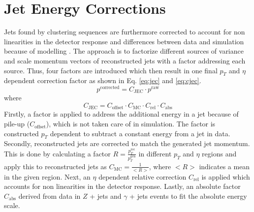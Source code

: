 \section{Jet Energy Corrections}
\label{sec:jec}
	Jets found by clustering sequences are furthermore corrected to account for non linearities in the detector response and differences between data and simulation because of modelling \cite{JEC}. The approach is to factorize different sources of variance and scale momentum vectors of reconstructed jets with a factor addressing each source. Thus, four factors are introduced which then result in one final $p_T$ and $\eta$ dependent correction factor as shown in Eq. \ref{eq:jec} and \ref{eq:cjec}.
	\begin{equation}
	p^{\text{corrected}} = C_{\text{JEC}} \cdot p^{\text{raw}}
	\label{eq:jec}
	\end{equation}
	where
	\begin{equation}
	C_{\text{JEC}} = C_{\text{offset}} \cdot C_{\text{MC}} \cdot C_{\text{rel}} \cdot C_{\text{abs}}
	\label{eq:cjec}
	\end{equation}
	Firstly, a factor is applied to address the additional energy in a jet because of pile-up ($C_{\text{offset}}$), which is not taken care of in simulation. The factor is constructed $p_T$ dependent to subtract a constant energy from a jet in data. Secondly, reconstructed jets are corrected to match the generated jet momentum. This is done by calculating a factor $R=\frac{p_T^{\text{rec}}}{p_T^{\text{gen}}}$ in different $p_T$ and $\eta$ regions and apply this to reconstructed jets as $C_{\text{MC}} = \frac{1}{<R>}$, where $<R>$ indicates a mean in the given region. Next, an $\eta$ dependent relative correction $C_{\text{rel}}$ is applied which accounts for non linearities in the detector response. Lastly, an absolute factor $C_{\text{abs}}$ derived from data in $Z$ + jets and $\gamma$ + jets events to fit the absolute energy scale.
	

